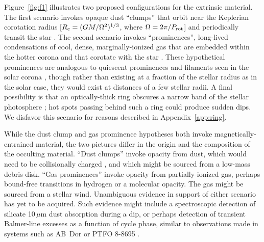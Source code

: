 \documentclass[11pt,twocolumn,tighten]{aastex63}
\begin{document}
Figure~\ref{fig:f1} illustrates two proposed configurations for the extrinsic
material.  The first scenario invokes opaque dust ``clumps'' that
orbit near the Keplerian corotation radius [$R_{\rm c} =
(GM/\Omega^2)^{1/3}$, where $\Omega = 2\pi/P_{\rm rot}$] and
periodically transit the star
\citep[e.g.][]{2017AJ....153..152S,2017MNRAS.471L.145F,2023MNRAS.518.4734S}.
The second scenario invokes ``prominences'', long-lived condensations
of cool, dense, marginally-ionized gas that are embedded within the
hotter corona and that corotate with the star
\citep{1989MNRAS.238..657C,2019MNRAS.482.2853J,2022MNRAS.514.5465W}.
These hypothetical prominences are analogous to quiescent prominences
and filaments seen in the solar corona \citep[see
e.g.][]{2015ASSL..415.....V}, though rather than existing at a
fraction of the stellar radius as in the solar case, they would exist
at distances of a few stellar radii.  A final possibility is that an
optically-thick ring obscures a narrow band of the stellar photosphere
\citep{2019ApJ...876..127Z}; hot spots passing behind such a ring
could produce sudden dips.  We disfavor this scenario for reasons
described in Appendix~\ref{app:ring}.

While the dust clump and gas prominence hypotheses both invoke
magnetically-entrained material, the two pictures differ in the origin
and the composition of the occulting material.   ``Dust clumps''
invoke opacity from dust, which would need to be collisionally charged
\citep{2023MNRAS.518.4734S}, and which might be sourced from a
low-mass debris disk.  ``Gas prominences'' invoke opacity from
partially-ionized gas, perhaps bound-free transitions in hydrogen or a
molecular opacity.  The gas might be sourced from a stellar wind.
Unambiguous evidence in support of either scenario has yet to be
acquired.  Such evidence might include a spectroscopic detection of
silicate 10\,$\mu$m dust absorption during a dip, or perhaps detection
of transient Balmer-line excesses as a function of cycle phase,
similar to observations made in systems such as AB~Dor
\citep[see][]{1999ASPC..158..146C} or PTFO 8-8695
\citep{2016ApJ...830...15J}.
\end{document}
